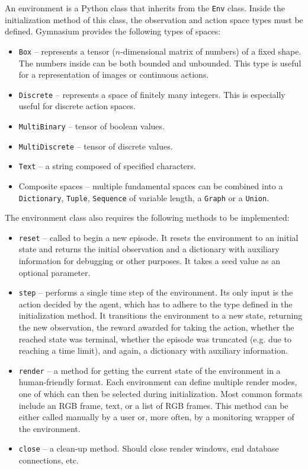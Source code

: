 \documentclass[
  digital,     %
  oneside,     %
  nosansbold,  %
  nocolorbold, %
  lof,         %
  lot,         %
]{fithesis4}
\begin{document}
An environment is a Python class that inherits from the \texttt{Env} class. Inside the initialization method of this class, the observation and action space types must be defined. Gymnasium provides the following types of spaces:

\begin{itemize}
    \item \texttt{Box} -- represents a tensor ($n$-dimensional matrix of numbers) of a fixed shape. The numbers inside can be both bounded and unbounded. This type is useful for a representation of images or continuous actions.
    \item \texttt{Discrete} -- represents a space of finitely many integers. This is especially useful for discrete action spaces.
    \item \texttt{MultiBinary} -- tensor of boolean values.
    \item \texttt{MultiDiscrete} -- tensor of discrete values. 
    \item \texttt{Text} -- a string composed of specified characters.
    \item Composite spaces -- multiple fundamental spaces can be combined into a \texttt{Dictionary}, \texttt{Tuple}, \texttt{Sequence} of variable length, a \texttt{Graph} or a \texttt{Union}.
\end{itemize}

The environment class also requires the following methods to be implemented:

\begin{itemize}
    \item \texttt{reset} -- called to begin a new episode. It resets the environment to an initial state and returns the initial observation and a dictionary with auxiliary information for debugging or other purposes. It takes a seed value as an optional parameter.
    \item \texttt{step} -- performs a single time step of the environment. Its only input is the action decided by the agent, which has to adhere to the type defined in the initialization method. It transitions the environment to a new state, returning the new observation, the reward awarded for taking the action, whether the reached state was terminal, whether the episode was truncated (e.g. due to reaching a time limit), and again, a dictionary with auxiliary information.
    \item \texttt{render} -- a method for getting the current state of the environment in a human-friendly format. Each environment can define multiple render modes, one of which can then be selected during initialization. Most common formats include an RGB frame, text, or a list of RGB frames. This method can be either called manually by a user or, more often, by a monitoring wrapper of the environment.
    \item \texttt{close} -- a clean-up method. Should close render windows, end database connections, etc.
\end{itemize}
\end{document}
